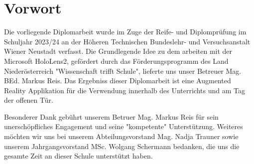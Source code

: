 \chapter{Vorwort}

Die vorliegende Diplomarbeit wurde im Zuge der Reife- und Diplomprüfung im Schuljahr 2023/24 an der Höheren Technischen
Bundeslehr- und Versuchsanstalt Wiener Neustadt verfasst. Die Grundlegende Idee zu dem arbeiten mit der Microsoft HoloLens2,
gefördert durch das Förderungsprogramm des Land Niederösterreich "Wissenschaft trifft Schule", lieferte uns unser Betreuer
Mag. BEd. Markus Reis. Das Ergebniss dieser Diplomarbeit ist eine Augmented Reality Applikation für die Verwendung innerhalb
des Unterrichts und am Tag der offenen Tür.

Besonderer Dank gebührt unserem Betruer Mag. Markus Reis  für sein unerschöpfliches Engagement und seine "kompetente"
Unterstützung. Weiteres möchten wir uns bei unserem Abteilungsvorstand Mag. Nadja Trauner sowie unserem Jahrgangsvorstand
MSc. Wolgang Schermann bedanken, die uns die gesamte Zeit an dieser Schule unterstützt haben.
